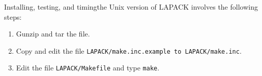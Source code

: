 \documentclass[11pt]{report}
\begin{document}
Installing, testing, and timing\footnotemark[\value{footnote}] the Unix version of LAPACK
involves the following steps:
\begin{enumerate}
\item Gunzip and tar the file.

\item Copy and edit the file \texttt{LAPACK/make.inc.example to LAPACK/make.inc}.

\item Edit the file \texttt{LAPACK/Makefile} and type \texttt{make}.

%
%
%
%
%

\end{enumerate}
\end{document}
